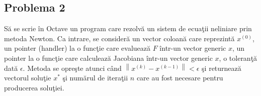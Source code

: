 \documentclass{exam}
\begin{document}
\subsection{Problema 2}
Să se scrie în Octave un program care rezolvă un sistem de ecuaţii neliniare prin metoda Newton. Ca intrare, se consideră un vector coloană care reprezintă $x^{(0)}$, un pointer (handler) la o funcţie care evaluează $F$ într-un vector generic $x$, un pointer la o funcţie care calculează Jacobiana într-un vector generic $x$, o toleranţă dată $\epsilon$. Metoda se opreşte atunci când  $\left \| x^{(k)}-x^{(k-1)} \right \|< \epsilon$ şi returnează vectorul soluţie $x^{*}$ şi numărul de iteraţii $n$ care au fost necesare pentru producerea soluţiei.
\end{document}
